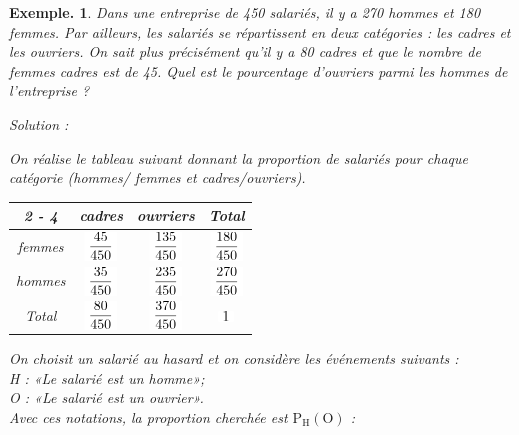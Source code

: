 \documentclass[12pt]{article}
\theoremstyle{break}
\newtheorem*{example}{Exemple.}
\begin{document}
\begin{example}
Dans une entreprise de 450 salariés, il y a 270 hommes et 180 femmes.
Par ailleurs, les salariés se répartissent en deux catégories : les cadres et les ouvriers.
On sait plus précisément qu'il y a 80 cadres et que le nombre de femmes cadres est de 45.
Quel est le pourcentage d'ouvriers parmi les hommes de l'entreprise ?

Solution :

On réalise le tableau suivant donnant la proportion de salariés pour chaque catégorie (hommes/ femmes et cadres/ouvriers).

\begin{center}
\renewcommand{\arraystretch}{2.5}
\begin{tabular}{|c|c|c|c|}
\cline { 2 - 4 }
\multicolumn{1}{c|}{} & cadres & ouvriers & Total \\
\hline
femmes & $\hideMW{\dfrac{45}{450}}$ & $\hideMW{\dfrac{135}{450}}$ & $\hideMW{\dfrac{180}{450}}$ \\
\hline
hommes & $\hideMW{\dfrac{35}{450}}$ & $\hideMW{\dfrac{235}{450}}$ & $\hideMW{\dfrac{270}{450}}$ \\
\hline
Total & $\hideMW{\dfrac{80}{450}}$ & $\hideMW{\dfrac{370}{450}}$ & $\hideMW{1}$ \\
\hline
\end{tabular}
\end{center}

On choisit un salarié au hasard et on considère les événements suivants :\\
H : «Le salarié est un homme»;\\
O : «Le salarié est un ouvrier».\\
Avec ces notations, la proportion cherchée est $\mathrm{P}_{\mathrm{H}}(\mathrm{O})$ :

\vspace{0.2em}

\end{example}
\end{document}
